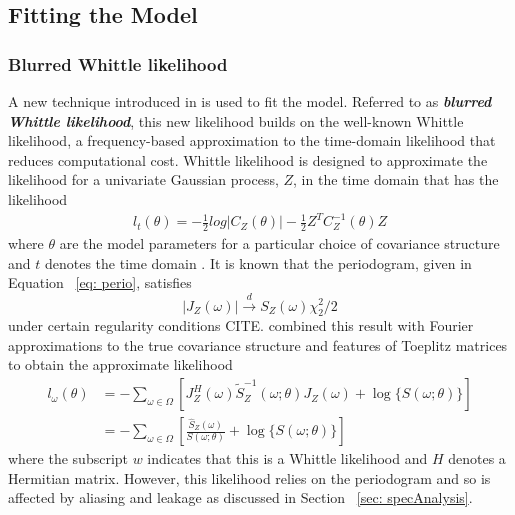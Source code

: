\documentclass{stat572Style}
\begin{document}
\subsection{Fitting the Model}
\subsubsection{Blurred Whittle likelihood}
A new technique introduced in  \citet{Sykulski2013}  is used to fit the model. Referred to as \textbf{\it{blurred Whittle likelihood}}, this new likelihood builds on the well-known Whittle likelihood, a frequency-based approximation  to the time-domain likelihood that reduces computational cost.  Whittle likelihood is designed to approximate the likelihood for a univariate Gaussian process, $Z$,  in the time domain that has the likelihood
\begin{align*}
l_{t}(\theta) = - \frac{1}{2} log |C_{Z}(\theta) | - \frac{1}{2} Z^{T} C_{Z}^{-1}(\theta)Z
\end{align*}
where $\theta$ are the model parameters for a particular choice of covariance structure  and $t$ denotes the time domain  \citep{Sykulski2013}.  It is known that  the periodogram, given in Equation ~\ref{eq: perio}, satisfies
\begin{equation}
|J_{Z}(\omega)| \overset{d}{\rightarrow} S_{Z}(\omega) \chi^{2}_{2}/2
\end{equation}
under certain regularity conditions CITE. \citet{Whittle1953} combined this result with Fourier approximations to the true covariance structure and features of Toeplitz matrices to obtain the approximate likelihood
\begin{align}
l_{\omega}(\theta) &= - \sum_{\omega \in \Omega} \left[ J_{Z}^{H}(\omega) \tilde{S}_{Z}^{-1}(\omega; \theta) J_{Z}(\omega) + \log \{S(\omega; \theta) \} \right]\\
\label{eq: bwl}
&= -\sum_{\omega \in \Omega} \left[ \frac{\hat{S}_{Z}(\omega)}{S(\omega;\theta)}  + \log  \{ S(\omega; \theta) \}\right]
\end{align}
 where the subscript $w$ indicates that this is a Whittle likelihood and $H$ denotes a Hermitian matrix.  However, this likelihood relies on the periodogram and so is affected by aliasing and leakage as discussed in Section ~\ref{sec: specAnalysis}. 
 
\end{document}
